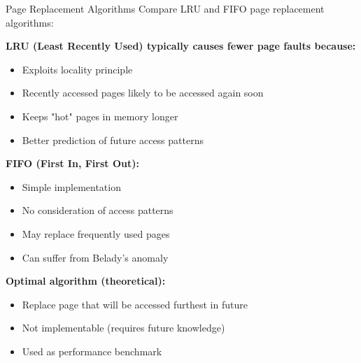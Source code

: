\begin{example2}{Page Replacement Algorithms}
    Compare LRU and FIFO page replacement algorithms:
    
    \textbf{LRU (Least Recently Used) typically causes fewer page faults because:}
    \begin{itemize}
        \item Exploits locality principle
        \item Recently accessed pages likely to be accessed again soon
        \item Keeps "hot" pages in memory longer
        \item Better prediction of future access patterns
    \end{itemize}
    
    \textbf{FIFO (First In, First Out):}
    \begin{itemize}
        \item Simple implementation
        \item No consideration of access patterns
        \item May replace frequently used pages
        \item Can suffer from Belady's anomaly
    \end{itemize}
    
    \textbf{Optimal algorithm (theoretical):}
    \begin{itemize}
        \item Replace page that will be accessed furthest in future
        \item Not implementable (requires future knowledge)
        \item Used as performance benchmark
    \end{itemize}
\end{example2}

